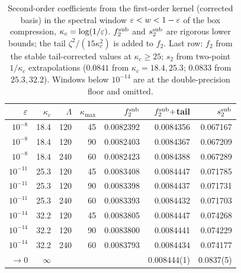\begin{table}[ht]\centering\small
\caption{Second-order coefficients from the first-order kernel (corrected basis) in the spectral window \(\varepsilon<w<1-\varepsilon\) of the box compression, \(\kappa_c=\log(1/\varepsilon)\). \(f_2^{\rm sub}\) and \(s_2^{\rm sub}\) are rigorous lower bounds; the tail \(\zeta^2/(15\kappa_c^2)\) is added to \(f_2\). Last row: \(f_2\) from the stable tail-corrected values at \(\kappa_c\ge25\); \(s_2\) from two-point \(1/\kappa_c\) extrapolations (\(0.0841\) from \(\kappa_c=18.4,25.3\); \(0.0833\) from \(25.3,32.2\)). Windows below \(10^{-14}\) are at the double-precision floor and omitted.}\label{tab:second-order}
\begin{tabular}{r r r r r r r}\toprule
\(\varepsilon\) & \(\kappa_c\) & \(\Lambda\) & \(\kappa_{\max}\) & \(f_2^{\rm sub}\) & \(f_2^{\rm sub}+\)tail & \(s_2^{\rm sub}\) \\\midrule
\(10^{-8}\) & 18.4 & 120 & 45 & 0.0082392 & 0.0084356 & 0.067167 \\
\(10^{-8}\) & 18.4 & 120 & 90 & 0.0082403 & 0.0084367 & 0.067209 \\
\(10^{-8}\) & 18.4 & 240 & 60 & 0.0082423 & 0.0084388 & 0.067289 \\
\(10^{-11}\) & 25.3 & 120 & 45 & 0.0083408 & 0.0084447 & 0.071785 \\
\(10^{-11}\) & 25.3 & 120 & 90 & 0.0083398 & 0.0084437 & 0.071731 \\
\(10^{-11}\) & 25.3 & 240 & 60 & 0.0083393 & 0.0084432 & 0.071703 \\
\(10^{-14}\) & 32.2 & 120 & 45 & 0.0083805 & 0.0084447 & 0.074268 \\
\(10^{-14}\) & 32.2 & 120 & 90 & 0.0083800 & 0.0084441 & 0.074229 \\
\(10^{-14}\) & 32.2 & 240 & 60 & 0.0083793 & 0.0084434 & 0.074177 \\
\(\to0\) & \(\infty\) & & & & 0.008444(1) & 0.0837(5) \\
\bottomrule\end{tabular}\end{table}
